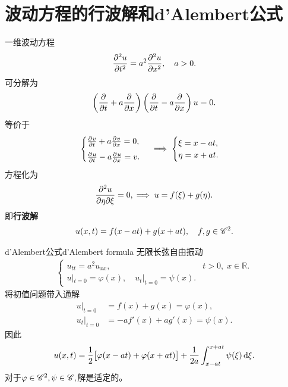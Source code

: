 \section{波动方程的行波解和d'Alembert公式}
一维波动方程
\[
	\pv[2]ut=a^2\pv[2]ux,\quad a>0.
\]
可分解为
\[
	\kh{\pp t+a\pp x}\kh{\pp t-a\pp x}u=0.
\]
等价于
\begin{align*}
	\begin{cases}
		\pv vt+a\pv vx=0, \\[1ex]
		\pv ut-a\pv ux=v.
	\end{cases}
	\implies
	\begin{cases}
		\xi=x-at, \\
		\eta=x+at.
	\end{cases}
\end{align*}
方程化为
\[
	\pw u\eta\xi=0,\implies u=f(\xi)+g(\eta).
\]
即\textbf{行波解}
\begin{align}
	u(x,t)=f(x-at)+g(x+at),\quad f,g\in\sC^2.
\end{align}
\begin{theorem}{d'Alembert公式}{d'Alembert formula}
	无限长弦自由振动
	\begin{align*}
		\begin{cases}
			u_{tt}=a^2u_{xx},&t>0,\;x\in\mathbb R. \\
			u|_{t=0}=\varphi(x),\quad u_t|_{t=0}=\psi(x).
		\end{cases}
	\end{align*}
	将初值问题带入通解
	\begin{align*}
		u|_{t=0}   & =f(x)+g(x)=\varphi(x),   \\
		u_t|_{t=0} & =-af'(x)+ag'(x)=\psi(x).
	\end{align*}
	因此
	\begin{align}
		u(x,t)=\frac12\bigfkh{\varphi(x-at)+\varphi(x+at)}+\frac1{2a}\int_{x-at}^{x+at}\psi(\xi)\d\xi.
	\end{align}
	对于$\varphi\in\sC^2,\psi\in\sC,$解是适定的。
\end{theorem}

